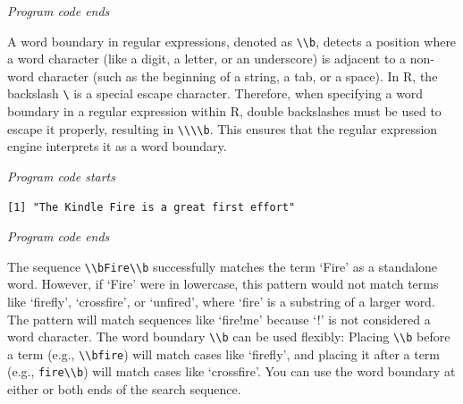\emph{Program code ends}

A word boundary in regular expressions, denoted as
\texttt{\textbackslash{}\textbackslash{}b}, detects a position where a
word character (like a digit, a letter, or an underscore) is adjacent to
a non-word character (such as the beginning of a string, a tab, or a
space). In R, the backslash \texttt{\textbackslash{}} is a special
escape character. Therefore, when specifying a word boundary in a
regular expression within R, double backslashes must be used to escape
it properly, resulting in
\texttt{\textbackslash{}\textbackslash{}\textbackslash{}\textbackslash{}b}.
This ensures that the regular expression engine interprets it
as a word boundary.

\emph{Program code starts}

\begin{Shaded}
\begin{Highlighting}[]
\NormalTok{(}\SpecialCharTok{\textbackslash{}\textbackslash{}}\SpecialCharTok{\textbackslash{}\textbackslash{}} \NormalTok{)}
\end{Highlighting}
\end{Shaded}

\begin{verbatim}
[1] "The Kindle Fire is a great first effort"
\end{verbatim}

\emph{Program code ends}

The sequence
\texttt{\textbackslash{}\textbackslash{}bFire\textbackslash{}\textbackslash{}b}
successfully matches the term `Fire' as a standalone word. However, if
`Fire' were in lowercase, this pattern would not match terms like
`firefly', `crossfire', or `unfired', where `fire' is a substring of a
larger word. The pattern will match sequences like `fire!me' because `!'
is not considered a word character. The word boundary
\texttt{\textbackslash{}\textbackslash{}b} can be used flexibly: Placing
\texttt{\textbackslash{}\textbackslash{}b} before a term (e.g.,
\texttt{\textbackslash{}\textbackslash{}bfire}) will match cases like
`firefly', and placing it after a term (e.g.,
\texttt{fire\textbackslash{}\textbackslash{}b}) will match cases like
`crossfire'. You can use the word boundary at either or both ends of the
search sequence.

